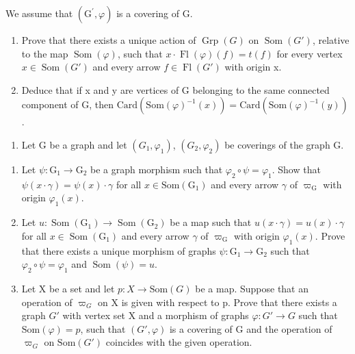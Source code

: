We assume that \((\mathrm{G}^{\prime},\varphi)\) is a covering of G.

\begin{enumerate}
\def\labelenumi{\alph{enumi})}
\item
  Prove that there exists a unique action of \(\operatorname{Grp}(G)\) on \(\operatorname{Som}(G')\), relative to the map \(\operatorname{Som}(\varphi)\), such that \(x \cdot \operatorname{Fl}(\varphi)(f) = t(f)\) for every vertex \(x \in \operatorname{Som}(G')\) and every arrow \(f \in \operatorname{Fl}(G')\) with origin x.
\item
  Deduce that if x and y are vertices of G belonging to the same connected component of G, then \(\text{Card}(\text{Som}(\varphi)^{-1}(x)) = \text{Card}(\text{Som}(\varphi)^{-1}(y))\).
\end{enumerate}

\begin{enumerate}
\def\labelenumi{\arabic{enumi})}
\setcounter{enumi}{6}
\tightlist
\item
  Let G be a graph and let \((G_{1},\varphi_{1})\), \((G_{2},\varphi_{2})\) be coverings of the graph G.
\end{enumerate}

\begin{enumerate}
\def\labelenumi{\alph{enumi})}
\item
  Let \(\psi\colon\mathrm{G}_{1}\to\mathrm{G}_{2}\) be a graph morphism such that \(\varphi_{2}\circ\psi=\varphi_{1}\). Show that \(\psi(x\cdot\gamma)=\psi(x)\cdot\gamma\) for all \(x\in\mathrm{Som}(\mathrm{G}_{1})\) and every arrow \(\gamma\) of \(\varpi_{\mathrm{G}}\) with origin \(\varphi_{1}(x)\).
\item
  Let \(u \colon \operatorname{Som}(\mathrm{G}_1) \to \operatorname{Som}(\mathrm{G}_2)\) be a map such that \(u(x \cdot \gamma) = u(x) \cdot \gamma\) for all \(x \in \operatorname{Som}(\mathrm{G}_1)\) and every arrow \(\gamma\) of \(\varpi_{\mathrm{G}}\) with origin \(\varphi_1(x)\). Prove that there exists a unique morphism of graphs \(\psi \colon \mathrm{G}_1 \to \mathrm{G}_2\) such that \(\varphi_2 \circ \psi = \varphi_1\) and \(\operatorname{Som}(\psi) = u\).
\item
  Let X be a set and let \(p: X \to \text{Som}(G)\) be a map. Suppose that an operation of \(\varpi_{G}\) on X is given with respect to p. Prove that there exists a graph \(G'\) with vertex set X and a morphism of graphs \(\varphi: G' \to G\) such that \(\text{Som}(\varphi) = p\), such that \((G', \varphi)\) is a covering of G and the operation of \(\varpi_{G}\) on \(\text{Som}(G')\) coincides with the given operation.
\end{enumerate}

